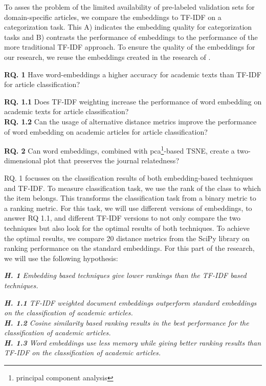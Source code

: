 \documentclass[../../Thesis.tex]{subfiles}
\begin{document}
To asses the problem of the limited availability of pre-labeled validation sets for domain-specific articles, we compare the embeddings to  TF-IDF on a categorization task. This A) indicates the embedding quality for categorization tasks and B) contrasts the performance of embeddings to the performance of the more traditional TF-IDF approach. To ensure the quality of the embeddings for our research, we reuse the embeddings created in the research of \citet{Truong2017Thesis}.
\begin{jumpin}
    \textbf{RQ. 1} Have word-embeddings a higher accuracy for academic texts than TF-IDF for article classification?\\
    \begin{adjustwidth}{0.3in}{}
        \textbf{RQ. 1.1} Does TF-IDF weighting increase the performance of word embedding on academic texts for article classification?\\
        \textbf{RQ. 1.2} Can the usage of alternative distance metrics improve the performance of word embedding on academic articles for article classification?
    \end{adjustwidth}
    \vspace{0.1in}\textbf{RQ. 2} Can word embeddings, combined with pca\footnote{principal component analysis}-based TSNE, create a two-dimensional plot that preserves the journal relatedness?
\end{jumpin}
RQ. 1 focusses on the classification results of both embedding-based techniques and TF-IDF.  To measure classification task, we use the rank of the class to which the item belongs. This transforms the classification task from a binary metric to a ranking metric. For this task, we will use different versions of embeddings, to answer RQ 1.1, and different TF-IDF versions to not only compare the two techniques but also look for the optimal results of both techniques. To achieve the optimal results, we compare 20 distance metrics from the SciPy library on ranking performance on the standard embeddings. For this part of the research, we will use the following hypothesis:
\begin{jumpin}
\textit{\textbf{H. 1} Embedding based techniques give lower rankings than the TF-IDF based techniques.}
\begin{jumpin}
\textit{\textbf{H. 1.1} TF-IDF weighted document embeddings outperform standard embeddings on the classification of academic articles.}\\
\textit{\textbf{H. 1.2} Cosine similarity based ranking results in the best performance for the classification of academic articles.}\\
\textit{\textbf{H. 1.3} Word embeddings use less memory while giving better ranking results than TF-IDF on the classification of academic articles.}
\end{jumpin}
\end{jumpin}
\end{document}
